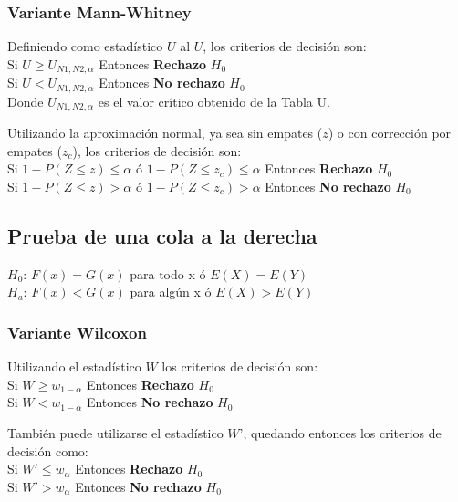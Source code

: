 \documentclass[]{book}
\theoremstyle{definition}
\theoremstyle{definition}
\theoremstyle{definition}
\theoremstyle{remark}
\begin{document}
\hypertarget{variante-mann-whitney-1}{%
\subsubsection{Variante Mann-Whitney}\label{variante-mann-whitney-1}}

Definiendo como estadístico \(U\) al \(U\), los criterios de decisión
son:\\
Si \(U≥U_{N1,N2,\alpha}\) Entonces \textbf{Rechazo} \(H_0\)\\
Si \(U<U_{N1,N2,\alpha}\) Entonces \textbf{No rechazo} \(H_0\)\\
Donde \(U_{N1,N2,\alpha}\) es el valor crítico obtenido de la Tabla U.

Utilizando la aproximación normal, ya sea sin empates (\(z\)) o con
corrección por empates (\(z_c\)), los criterios de decisión son:\\
Si \(1-P(Z\le z)\le\alpha\) ó \(1-P(Z≤z_c )\le\alpha\) Entonces
\textbf{Rechazo} \(H_0\)\\
Si \(1-P(Z≤z)>\alpha\) ó \(1-P(Z≤z_c )>\alpha\) Entonces \textbf{No
rechazo} \(H_0\)

\hypertarget{prueba-de-una-cola-a-la-derecha}{%
\subsection{Prueba de una cola a la
derecha}\label{prueba-de-una-cola-a-la-derecha}}

\(H_0\): \(F(x)=G(x)\) para todo x ó \(E(X)=E(Y)\)\\
\(H_a\): \(F(x)<G(x)\) para algún x ó \(E(X)>E(Y)\)

\hypertarget{variante-wilcoxon-2}{%
\subsubsection{Variante Wilcoxon}\label{variante-wilcoxon-2}}

Utilizando el estadístico \(W\) los criterios de decisión son:\\
Si \(W≥w_{1-\alpha}\) Entonces \textbf{Rechazo} \(H_0\)\\
Si \(W<w_{1-\alpha}\) Entonces \textbf{No rechazo} \(H_0\)

También puede utilizarse el estadístico \(W’\), quedando entonces los
criterios de decisión como:\\
Si \(W'≤w_\alpha\) Entonces \textbf{Rechazo} \(H_0\)\\
Si \(W'>w_\alpha\) Entonces \textbf{No rechazo} \(H_0\)
\end{document}
